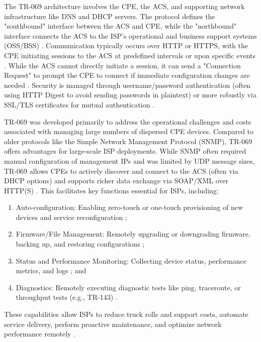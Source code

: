 The TR-069 architecture involves the CPE, the ACS, and supporting network infrastructure like DNS and DHCP servers. The protocol defines the "southbound" interface between the ACS and CPE, while the "northbound" interface connects the ACS to the ISP's operational and business support systems (OSS/BSS) \cite{router_guide}. Communication typically occurs over HTTP or HTTPS, with the CPE initiating sessions to the ACS at predefined intervals or upon specific events \cite{router_security_vulnerabilities}. While the ACS cannot directly initiate a session, it can send a "Connection Request" to prompt the CPE to connect if immediate configuration changes are needed \cite{router_security_vulnerabilities}. Security is managed through username/password authentication (often using HTTP Digest to avoid sending passwords in plaintext) or more robustly via SSL/TLS certificates for mutual authentication \cite{router_security_vulnerabilities}.

TR-069 was developed primarily to address the operational challenges and costs associated with managing large numbers of dispersed CPE devices. Compared to older protocols like the Simple Network Management Protocol (SNMP), TR-069 offers advantages for large-scale ISP deployments. While SNMP often required manual configuration of management IPs and was limited by UDP message sizes, TR-069 allows CPEs to actively discover and connect to the ACS (often via DHCP options) and supports richer data exchange via SOAP/XML over HTTP(S) \cite{router_guide}. This facilitates key functions essential for ISPs, including:

\begin{enumerate}
\item Auto-configuration: Enabling zero-touch or one-touch provisioning of new devices and service reconfiguration \cite{soho_sdn};

\item Firmware/File Management: Remotely upgrading or downgrading firmware, backing up, and restoring configurations \cite{soho_sdn};

\item Status and Performance Monitoring: Collecting device status, performance metrics, and logs \cite{soho_sdn}; and

\item Diagnostics: Remotely executing diagnostic tests like ping, traceroute, or throughput tests (e.g., TR-143) \cite{soho_sdn}.
\end{enumerate}

These capabilities allow ISPs to reduce truck rolls and support costs, automate service delivery, perform proactive maintenance, and optimize network performance remotely \cite{router_guide}.


